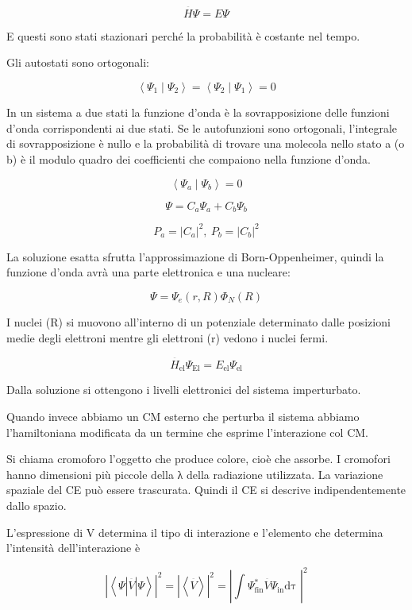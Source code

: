 \[\overset{\overline{}}{H}\Psi = E\Psi\]

E questi sono stati stazionari perché la probabilità è costante nel
tempo.

Gli autostati sono ortogonali:

\[\left\langle \Psi_{1} \middle| \Psi_{2} \right\rangle = \left\langle \Psi_{2} \middle| \Psi_{1} \right\rangle = 0\]

In un sistema a due stati la funzione d'onda è la sovrapposizione delle
funzioni d'onda corrispondenti ai due stati. Se le autofunzioni sono
ortogonali, l'integrale di sovrapposizione è nullo e la probabilità di
trovare una molecola nello stato a (o b) è il modulo quadro dei
coefficienti che compaiono nella funzione d'onda.

\[\left\langle \Psi_{a} \middle| \Psi_{b} \right\rangle = 0\]

\[\Psi = C_{a}\Psi_{a} + C_{b}\Psi_{b}\]

\[P_{a} = \left| C_{a} \right|^{2},\ P_{b} = \left| C_{b} \right|^{2}\]

La soluzione esatta sfrutta l'approssimazione di Born-Oppenheimer,
quindi la funzione d'onda avrà una parte elettronica e una nucleare:

\[\Psi = \Psi_{e}\left( r,R \right)\Phi_{N}\left( R \right)\]

I nuclei (R) si muovono all'interno di un potenziale determinato dalle
posizioni medie degli elettroni mentre gli elettroni (r) vedono i nuclei
fermi.

\[{\overset{\overline{}}{H}}_{\text{el}}\Psi_{\text{El}} = E_{\text{el}}\Psi_{\text{el}}\]

Dalla soluzione si ottengono i livelli elettronici del sistema
imperturbato.

Quando invece abbiamo un CM esterno che perturba il sistema abbiamo
l'hamiltoniana modificata da un termine che esprime l'interazione col
CM.

Si chiama cromoforo l'oggetto che produce colore, cioè che assorbe. I
cromofori hanno dimensioni più piccole della λ della radiazione
utilizzata. La variazione spaziale del CE può essere trascurata. Quindi
il CE si descrive indipendentemente dallo spazio.

L'espressione di V determina il tipo di interazione e l'elemento che
determina l'intensità dell'interazione è

\[\left| \left\langle \Psi\left| \overset{\overline{}}{V} \right|\Psi \right\rangle \right|^{2} = \left| \left\langle \overset{\overline{}}{V} \right\rangle \right|^{2} = \left| \int_{}^{}{\Psi_{\text{fin}}^{*}\overset{\overline{}}{V}\Psi_{\text{in}}\text{dτ\ }} \right|^{2}\]

